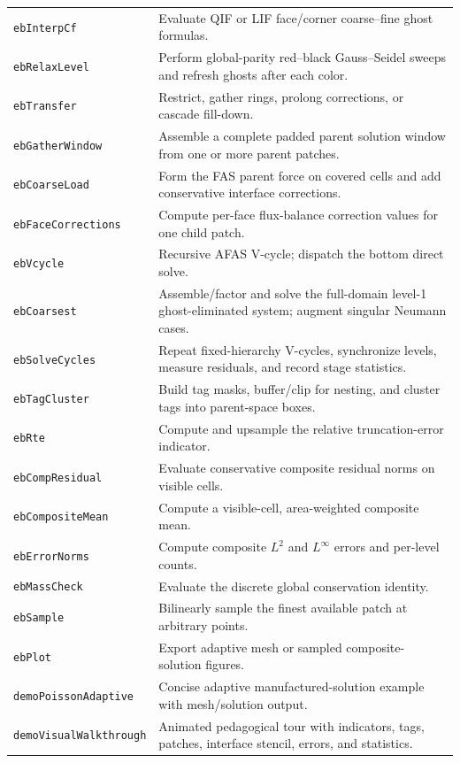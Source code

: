 \documentclass[11pt,oneside,openany]{book}
\newcommand{\code}[1]{\textnormal{\texttt{#1}}}
\begin{document}
\begin{longtable}{@{}p{}p{}@{}}
\code{ebInterpCf} & Evaluate QIF or LIF face/corner coarse--fine ghost formulas. \\
\code{ebRelaxLevel} & Perform global-parity red--black Gauss--Seidel sweeps and refresh ghosts after each color. \\
\code{ebTransfer} & Restrict, gather rings, prolong corrections, or cascade fill-down. \\
\code{ebGatherWindow} & Assemble a complete padded parent solution window from one or more parent patches. \\
\code{ebCoarseLoad} & Form the FAS parent force on covered cells and add conservative interface corrections. \\
\code{ebFaceCorrections} & Compute per-face flux-balance correction values for one child patch. \\
\code{ebVcycle} & Recursive AFAS V-cycle; dispatch the bottom direct solve. \\
\code{ebCoarsest} & Assemble/factor and solve the full-domain level-1 ghost-eliminated system; augment singular Neumann cases. \\
\code{ebSolveCycles} & Repeat fixed-hierarchy V-cycles, synchronize levels, measure residuals, and record stage statistics. \\
\code{ebTagCluster} & Build tag masks, buffer/clip for nesting, and cluster tags into parent-space boxes. \\
\code{ebRte} & Compute and upsample the relative truncation-error indicator. \\
\code{ebCompResidual} & Evaluate conservative composite residual norms on visible cells. \\
\code{ebCompositeMean} & Compute a visible-cell, area-weighted composite mean. \\
\code{ebErrorNorms} & Compute composite $L^2$ and $L^\infty$ errors and per-level counts. \\
\code{ebMassCheck} & Evaluate the discrete global conservation identity. \\
\code{ebSample} & Bilinearly sample the finest available patch at arbitrary points. \\
\code{ebPlot} & Export adaptive mesh or sampled composite-solution figures. \\
\code{demoPoissonAdaptive} & Concise adaptive manufactured-solution example with mesh/solution output. \\
\code{demoVisualWalkthrough} & Animated pedagogical tour with indicators, tags, patches, interface stencil, errors, and statistics. \\
\bottomrule
\end{longtable}
\normalsize
\end{document}
